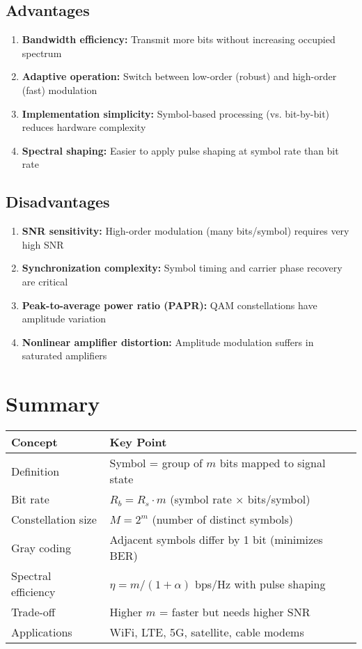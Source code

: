 \subsection*{Advantages}

\begin{enumerate}
\item \textbf{Bandwidth efficiency:} Transmit more bits without increasing occupied spectrum
\item \textbf{Adaptive operation:} Switch between low-order (robust) and high-order (fast) modulation
\item \textbf{Implementation simplicity:} Symbol-based processing (vs. bit-by-bit) reduces hardware complexity
\item \textbf{Spectral shaping:} Easier to apply pulse shaping at symbol rate than bit rate
\end{enumerate}

\subsection*{Disadvantages}

\begin{enumerate}
\item \textbf{SNR sensitivity:} High-order modulation (many bits/symbol) requires very high SNR
\item \textbf{Synchronization complexity:} Symbol timing and carrier phase recovery are critical
\item \textbf{Peak-to-average power ratio (PAPR):} QAM constellations have amplitude variation
\item \textbf{Nonlinear amplifier distortion:} Amplitude modulation suffers in saturated amplifiers
\end{enumerate}

\section{Summary}

\begin{center}
\begin{tabular}{@{}ll@{}}
\toprule
\textbf{Concept} & \textbf{Key Point} \\
\midrule
Definition & Symbol = group of $m$ bits mapped to signal state \\
Bit rate & $R_b = R_s \cdot m$ (symbol rate $\times$ bits/symbol) \\
Constellation size & $M = 2^m$ (number of distinct symbols) \\
Gray coding & Adjacent symbols differ by 1 bit (minimizes BER) \\
Spectral efficiency & $\eta = m / (1+\alpha)$ bps/Hz with pulse shaping \\
Trade-off & Higher $m$ = faster but needs higher SNR \\
Applications & WiFi, LTE, 5G, satellite, cable modems \\
\bottomrule
\end{tabular}
\end{center}

